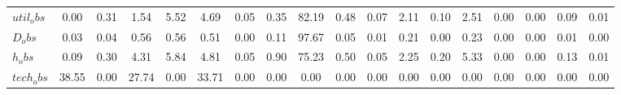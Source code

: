 \begin{center}
\begin{longtable}{lccccccccccccccccc}
$util_obs     $	 & 	            0.00	 & 	            0.31	 & 	            1.54	 & 	            5.52	 & 	            4.69	 & 	            0.05	 & 	            0.35	 & 	           82.19	 & 	            0.48	 & 	            0.07	 & 	            2.11	 & 	            0.10	 & 	            2.51	 & 	            0.00	 & 	            0.00	 & 	            0.09	 & 	            0.01 \\ 
$D_obs        $	 & 	            0.03	 & 	            0.04	 & 	            0.56	 & 	            0.56	 & 	            0.51	 & 	            0.00	 & 	            0.11	 & 	           97.67	 & 	            0.05	 & 	            0.01	 & 	            0.21	 & 	            0.00	 & 	            0.23	 & 	            0.00	 & 	            0.00	 & 	            0.01	 & 	            0.00 \\ 
$h_obs        $	 & 	            0.09	 & 	            0.30	 & 	            4.31	 & 	            5.84	 & 	            4.81	 & 	            0.05	 & 	            0.90	 & 	           75.23	 & 	            0.50	 & 	            0.05	 & 	            2.25	 & 	            0.20	 & 	            5.33	 & 	            0.00	 & 	            0.00	 & 	            0.13	 & 	            0.01 \\ 
$tech_obs     $	 & 	           38.55	 & 	            0.00	 & 	           27.74	 & 	            0.00	 & 	           33.71	 & 	            0.00	 & 	            0.00	 & 	            0.00	 & 	            0.00	 & 	            0.00	 & 	            0.00	 & 	            0.00	 & 	            0.00	 & 	            0.00	 & 	            0.00	 & 	            0.00	 & 	            0.00 \\ 
\end{longtable}
 \end{center}

